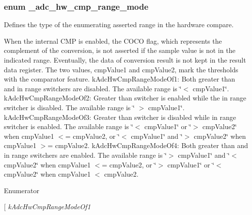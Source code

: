 \subsubsection[{\texorpdfstring{\+\_\+adc\+\_\+hw\+\_\+cmp\+\_\+range\+\_\+mode}{_adc_hw_cmp_range_mode}}]{\setlength{\rightskip}{0pt plus 5cm}enum {\bf \+\_\+adc\+\_\+hw\+\_\+cmp\+\_\+range\+\_\+mode}}\hypertarget{group__adc__hal_ga14559d14c936d0c6955676098ed26a08}{}\label{group__adc__hal_ga14559d14c936d0c6955676098ed26a08}


Defines the type of the enumerating asserted range in the hardware compare. 

When the internal C\+MP is enabled, the C\+O\+CO flag, which represents the complement of the conversion, is not asserted if the sample value is not in the indicated range. Eventually, the data of conversion result is not kept in the result data register. The two values, cmp\+Value1 and cmp\+Value2, mark the thresholds with the comparator feature. k\+Adc\+Hw\+Cmp\+Range\+Mode\+Of1\+: Both greater than and in range switchers are disabled. The available range is \char`\"{}$<$ cmp\+Value1\char`\"{}. k\+Adc\+Hw\+Cmp\+Range\+Mode\+Of2\+: Greater than switcher is enabled while the in range switcher is disabled. The available range is \char`\"{} $>$ cmp\+Value1\char`\"{}. k\+Adc\+Hw\+Cmp\+Range\+Mode\+Of3\+: Greater than switcher is disabled while in range switcher is enabled. The available range is \char`\"{}$<$ cmp\+Value1\char`\"{} or \char`\"{}$>$ cmp\+Value2\char`\"{} when cmp\+Value1 $<$= cmp\+Value2, or \char`\"{}$<$ cmp\+Value1\char`\"{} and \char`\"{}$>$ cmp\+Value2\char`\"{} when cmp\+Value1 $>$= cmp\+Value2. k\+Adc\+Hw\+Cmp\+Range\+Mode\+Of4\+: Both greater than and in range switchers are enabled. The available range is \char`\"{}$>$ cmp\+Value1\char`\"{} and \char`\"{}$<$ cmp\+Value2\char`\"{} when cmp\+Value1 $<$= cmp\+Value2, or \char`\"{}$>$ cmp\+Value1\char`\"{} or \char`\"{}$<$ cmp\+Value2\char`\"{} when cmp\+Value1 $<$ cmp\+Value2. \begin{Desc}
\item[Enumerator]\par
\begin{description}
\item[{\em 
k\+Adc\+Hw\+Cmp\+Range\+Mode\+Of1\hypertarget{group__adc__hal_gga14559d14c936d0c6955676098ed26a08a7c952a491603be1b9f3c910832399903}{}\label{group__adc__hal_gga14559d14c936d0c6955676098ed26a08a7c952a491603be1b9f3c910832399903}
}
\end{description}
\end{Desc}
